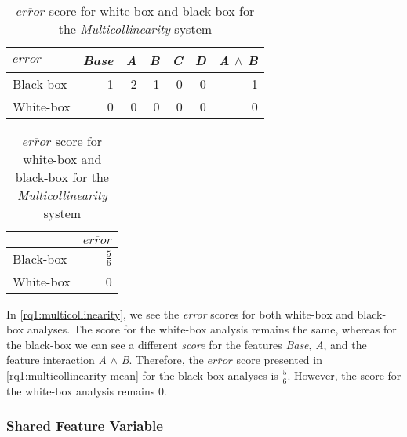     \begin{table}[H]
        \begin{minipage}{.5\linewidth}
            \centering
            \begin{tabular}{lrrrrrr}    \toprule
            $error$    & \emph{Base} & \emph{A} & \emph{B} & \emph{C} & \emph{D} & \emph{A} $\land$ \emph{B}   \\ \midrule
            Black-box & 1 & 2 & 1 & 0 & 0 & 1      \\
            White-box & 0 & 0 & 0 & 0 & 0 & 0      \\ \bottomrule
            \end{tabular}
            \caption{Respective \emph{error} scores for white-box and black-box {\perfInfluenceModel}s for the \emph{Multicollinearity} system.}
            \label{rq1:multicollinearity}
        \end{minipage}%
        \hspace{7mm}
    \begin{minipage}{.37\linewidth}
        \centering
        \begin{tabular}{lr}
            \toprule
                        & $\overline{error}$   \\ \midrule
            Black-box & $\frac{5}{6}$              \\
            White-box & 0              \\ \bottomrule
            \end{tabular}
            \caption{$\overline{error}$ score for white-box and black-box for the \emph{Multicollinearity} system}
            \label{rq1:multicollinearity-mean}
        \end{minipage}
    \end{table}

In \autoref{rq1:multicollinearity}, we see the \emph{error} scores for both white-box and black-box analyses. 
The score for the white-box analysis remains the same, whereas for the black-box we can see a different \emph{score} for the features \emph{Base}, 
\emph{A}, and the feature interaction \emph{A} $\land$ \emph{B}. 
Therefore, the $\overline{error}$ score presented in \autoref{rq1:multicollinearity-mean} for the black-box analyses is $\frac{5}{6}$. 
However, the score for the white-box analysis remains $0$. 

    \subsubsection*{Shared Feature Variable} %


